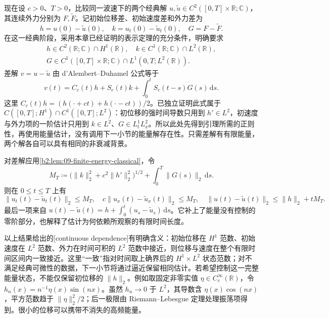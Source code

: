现在设 \(c>0\)、\(T>0\)，比较同一波速下的两个经典解 \(u,\widetilde u\in C^2([0,T]\times\mathbb R;\mathbb C)\)，其连续外力分别为 \(F,\widetilde F\)。记初始位移差、初始速度差和外力差为
\[
 h=u(0)-\widetilde u(0),\quad k=u_t(0)-\widetilde u_t(0),\quad G=F-\widetilde F.
\]
在这一经典阶段，采用本章已经证明的表示定理的充分条件，明确要求
\[
 \begin{gathered}
 h\in C^2(\mathbb R;\mathbb C)\cap H^1(\mathbb R),\quad
 k\in C^1(\mathbb R;\mathbb C)\cap L^2(\mathbb R),\\
 G\in C^1([0,T]\times\mathbb R;\mathbb C)\cap L^1(0,T;L^2(\mathbb R)).
 \end{gathered}
\]
差解 \(v=u-\widetilde u\) 由 d'Alembert--Duhamel 公式等于
\[
 v(t)=C_c(t)h+S_c(t)k+\int_0^tS_c(t-s)G(s)\,\mathrm{d}s.
\]
这里 \(C_c(t)h=(h(\cdot+ct)+h(\cdot-ct))/2\)。已独立证明此式属于 \(C([0,T];H^1)\cap C^1([0,T];L^2)\)：初位移的强时间导数只用到 \(h'\in L^2\)，初速度与外力项的一阶估计只用到 \(k\in L^2\)、\(G\in L^1_tL^2_x\)。所以此处先得到引理所需的正则性，再使用能量估计，没有调用下一小节的能量解存在性。只需差解有有限能量，两个解各自可以具有相同的非衰减背景。

对差解应用\cref{b2:lem:09-finite-energy-classical}，令
\[
 M_T\coloneqq\bigl(\|k\|_2^2+c^2\|h'\|_2^2\bigr)^{1/2}
                +\int_0^T\|G(s)\|_2\,\mathrm{d}s.
\]
则在 \(0\leq t\leq T\) 上有
\begin{equation}\label{b2:eq:09-stability}
 \|u_t(t)-\widetilde u_t(t)\|_2\leq M_T,\quad
 c\|u_x(t)-\widetilde u_x(t)\|_2\leq M_T,\quad
 \|u(t)-\widetilde u(t)\|_2\leq\|h\|_2+tM_T.
\end{equation}
最后一项来自 \(u(t)-\widetilde u(t)=h+\int_0^t(u_s-\widetilde u_s)\,\mathrm{d}s\)。它补上了能量没有控制的零阶部分，也解释了估计为何依赖所观察的有限时间长度。

\ProseParagraphBreak

以上结果给出的[continuous dependence]有明确含义：初始位移在 \(H^1\) 范数、初始速度在 \(L^2\) 范数、外力在时间可积的 \(L^2\) 范数中接近，则位移与速度在整个有限时间区间内一致接近。这里“一致”指对时间取上确界后的 \(H^1\times L^2\) 状态范数；对不满足经典可微性的数据，下一小节将通过逼近保留相同估计。若希望控制这一完整能量状态，不能仅保留初位移的 \(\|h\|_2\)。例如取固定非零实值 \(\eta\in C_c^\infty(\mathbb R)\)，令 \(h_n(x)=n^{-1}\eta(x)\sin(nx)\)。虽然 \(h_n\to0\) 于 \(L^2\)，其导数含 \(\eta(x)\cos(nx)\)，平方范数趋于 \(\|\eta\|_2^2/2\)；后一极限由 Riemann--Lebesgue 定理处理振荡项得到。很小的位移可以携带不消失的高频能量。

